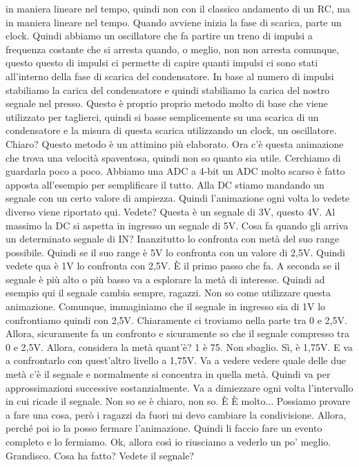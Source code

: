 in maniera lineare nel tempo, quindi non con il classico andamento di un RC, ma in maniera lineare nel tempo. Quando avviene inizia la fase di scarica, parte un clock. Quindi abbiamo un oscillatore che fa partire un treno di impulsi a frequenza costante che si arresta quando, o meglio, non non arresta comunque, questo questo di impulsi ci permette di capire quanti impulsi ci sono stati all'interno della fase di scarica del condensatore. In base al numero di impulsi stabiliamo la carica del condensatore e quindi stabiliamo la carica del nostro segnale nel presso. Questo è proprio proprio metodo molto di base che viene utilizzato per taglierci, quindi si basse semplicemente su una scarica di un condensatore e la misura di questa scarica utilizzando un clock, un oscillatore. Chiaro? Questo metodo è un attimino più elaborato. Ora c'è questa animazione che trova una velocità spaventosa, quindi non so quanto sia utile. Cerchiamo di guardarla poco a poco. Abbiamo una ADC a 4-bit un ADC molto scarso è fatto apposta all'esempio per semplificare il tutto. Alla DC stiamo mandando un segnale con un certo valore di ampiezza. Quindi l'animazione ogni volta lo vedete diverso viene riportato qui. Vedete? Questa è un segnale di 3V, questo 4V. Al massimo la DC si aspetta in ingresso un segnale di 5V. Cosa fa quando gli arriva un determinato segnale di IN? Inanzitutto lo confronta con metà del suo range possibile. Quindi se il suo range è 5V lo confronta con un valore di 2,5V. Quindi vedete qua è 1V lo confronta con 2,5V. È il primo passo che fa. A seconda se il segnale è più alto o più basso va a esplorare la metà di interesse. Quindi ad esempio qui il segnale cambia sempre, ragazzi. Non so come utilizzare questa animazione. Comunque, immaginiamo che il segnale in ingresso sia di 1V lo confrontiamo quindi con 2,5V. Chiaramente ci troviamo nella parte tra 0 e 2,5V. Allora, sicuramente fa un confronto e sicuramente so che il segnale compresso tra 0 e 2,5V. Allora, considera la metà quant'è? 1 è 75. Non sbaglio. Sì, è 1,75V. E va a confrontarlo con quest'altro livello a 1,75V. Va a vedere vedere quale delle due metà c'è il segnale e normalmente si concentra in quella metà. Quindi va per approssimazioni successive sostanzialmente. Va a dimiezzare ogni volta l'intervallo in cui ricade il segnale. Non so se è chiaro, non so. È È molto... Possiamo provare a fare una cosa, però i ragazzi da fuori mi devo cambiare la condivisione. Allora, perché poi io la posso fermare l'animazione. Quindi li faccio fare un evento completo e lo fermiamo. Ok, allora così io riusciamo a vederlo un po' meglio. Grandisco. Cosa ha fatto? Vedete il segnale? 

